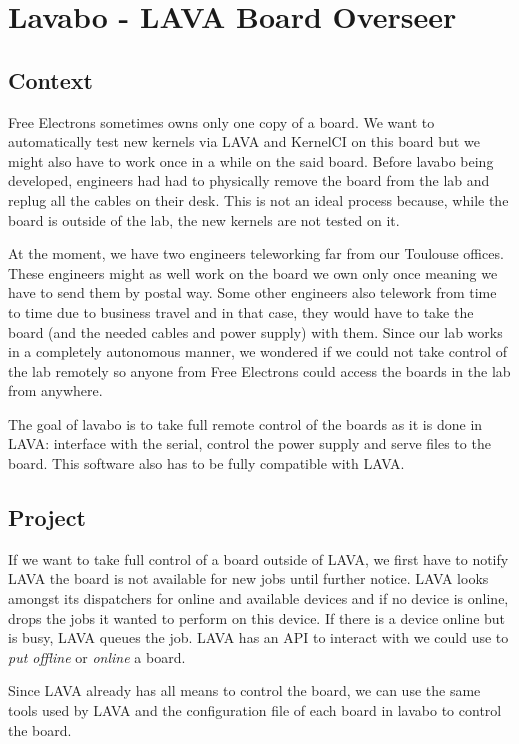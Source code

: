 \chapter{Lavabo - LAVA Board Overseer}
\section{Context}

Free Electrons sometimes owns only one copy of a board. We want to automatically test new kernels via LAVA and KernelCI on this board but we might also have to work once in a while on the said board. Before lavabo being developed, engineers had had to physically remove the board from the lab and replug all the cables on their desk. This is not an ideal process because, while the board is outside of the lab, the new kernels are not tested on it.

At the moment, we have two engineers teleworking far from our Toulouse offices. These engineers might as well work on the board we own only once meaning we have to send them by postal way. Some other engineers also telework from time to time due to business travel and in that case, they would have to take the board (and the needed cables and power supply) with them. Since our lab works in a completely autonomous manner, we wondered if we could not take control of the lab remotely so anyone from Free Electrons could access the boards in the lab from anywhere.

The goal of lavabo is to take full remote control of the boards as it is done in LAVA: interface with the serial, control the power supply and serve files to the board. This software also has to be fully compatible with LAVA.

\section{Project}

If we want to take full control of a board outside of LAVA, we first have to notify LAVA the board is not available for new jobs until further notice. LAVA looks amongst its dispatchers for online and available devices and if no device is online, drops the jobs it wanted to perform on this device. If there is a device online but is busy, LAVA queues the job. LAVA has an API to interact with  we could use to \textit{put offline} or \textit{online} a board.

Since LAVA already has all means to control the board, we can use the same tools used by LAVA and the configuration file of each board in lavabo to control the board.

